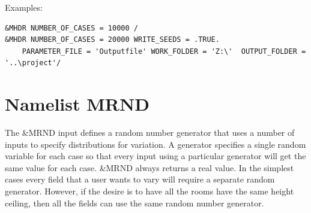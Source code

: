 \documentclass[12pt,twoside]{book}
\begin{document}
\vspace{\baselineskip}
\noindent Examples:
\begin{lstlisting}[basicstyle=\scriptsize]
&MHDR NUMBER_OF_CASES = 10000 /
&MHDR NUMBER_OF_CASES = 20000 WRITE_SEEDS = .TRUE.
	PARAMETER_FILE = 'Outputfile' WORK_FOLDER = 'Z:\'  OUTPUT_FOLDER = '..\project'/
\end{lstlisting}


\section{Namelist MRND}
\label{info:MRND}

The {\ct \&MRND} input defines a random number generator that uses a number of inputs to specify distributions for variation. A generator specifies a single random variable for each case so that every input using a particular generator will get the same value for each case. {\ct \&MRND} always returns a real value. In the simplest cases every field that a user wants to vary will require a separate random generator. However, if the desire is to have all the rooms have the same height ceiling, then all the fields can use the same random number generator.
\end{document}
